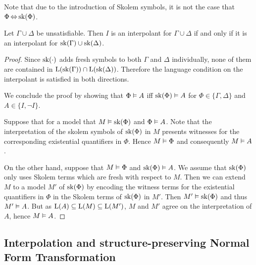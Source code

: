 Note that due to the introduction of Skolem symbols, it is not the case that $\Phi \operatorname{\Leftrightarrow} \operatorname{sk}(\Phi)$.

\begin{prop}
	\label{prop:sk_interpolant}
	Let $\Gamma \cup \Delta$ be unsatisfiable.
	Then $I$ is an interpolant for $\Gamma \cup \Delta$ if and only if it is an interpolant for $\operatorname{sk}(\Gamma) \cup \operatorname{sk}(\Delta)$. 
\end{prop}

\begin{proof}
	Since $\operatorname{sk}(\cdot)$ adds fresh symbols to both $\Gamma$ and $\Delta$ individually,
	none of them are contained in $\operatorname{L}(\operatorname{sk}(\Gamma)) \cap \operatorname{L}(\operatorname{sk}(\Delta))$.
	Therefore the language condition on the interpolant is satisfied in both directions.



	We conclude the proof by showing that $\Phi \vDash A$ iff $\operatorname{sk}(\Phi) \vDash A$ for $\Phi \in \{\Gamma, \Delta\}$ and $A \in \{I, \lnot I\}$.

	Suppose that for a model that $M \vDash \operatorname{sk}(\Phi)$ and $\Phi \vDash A$.
	Note that the interpretation of the skolem symbols of $\operatorname{sk}(\Phi)$ in $M$ presents witnesses for the corresponding existential quantifiers in $\Phi$.
	Hence $M \vDash \Phi$ and consequently $M\vDash A$.

	On the other hand, suppose that $M \vDash \Phi$ and $\operatorname{sk}(\Phi) \vDash A$.
	We assume that $\operatorname{sk}(\Phi)$ only uses Skolem terms which are fresh with respect to $M$.
	Then we can extend $M$ to a model $M'$ of $\operatorname{sk}(\Phi)$ by encoding the witness terms for the existential quantifiers in $\Phi$ in the Skolem terms of $\operatorname{sk}(\Phi)$ in $M'$.
	Then $M' \vDash \operatorname{sk}(\Phi)$ and thus $M' \vDash A$.
	But as $\operatorname{L}(A) \subseteq \operatorname{L}(M) \subseteq \operatorname{L}(M')$, $M$ and $M'$ agree on the interpretation of $A$, hence $M \vDash A$.
\end{proof}


\subsection{Interpolation and structure-preserving Normal Form Transformation}


